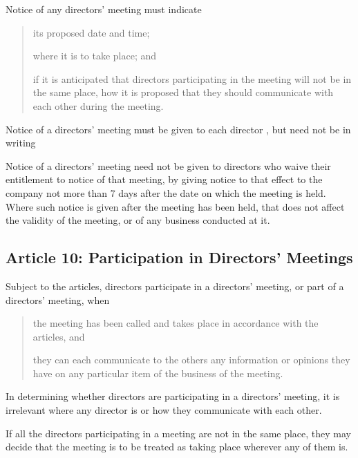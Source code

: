 \documentclass[letterpaper,10pt,openany,oneside,english]{sphinxmanual}
\begin{document}
 Notice of any directors’ meeting must indicate
\begin{quote}

 its proposed date and time;

 where it is to take place; and

 if it is anticipated that directors participating in the meeting will not be in the same place, how it is proposed that they should communicate with each other during the meeting.
\end{quote}

 Notice of a directors’ meeting must be given to each director , but need not be in writing

 Notice of a directors’ meeting need not be given to directors who waive their entitlement to notice of that meeting, by giving notice to that effect to the company not more than 7 days after the date on which the meeting is held. Where such notice is given after the meeting has been held, that does not affect the validity of the meeting, or of any business conducted at it.


\subsection{Article 10: Participation in Directors’ Meetings}
\label{\detokenize{directors:article-10-participation-in-directors-meetings}}\label{\detokenize{directors:article-10}}
 Subject to the articles, directors participate in a directors’ meeting, or part of a directors’ meeting, when
\begin{quote}

 the meeting has been called and takes place in accordance with the articles, and

 they can each communicate to the others any information or opinions they have on any particular item of the business of the meeting.
\end{quote}

 In determining whether directors are participating in a directors’ meeting, it is irrelevant where any director is or how they communicate with each other.

 If all the directors participating in a meeting are not in the same place, they may decide that the meeting is to be treated as taking place wherever any of them is.
\end{document}

